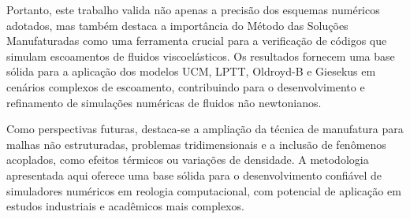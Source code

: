 Portanto, este trabalho valida não apenas a precisão dos esquemas numéricos adotados, mas também destaca a importância do Método das Soluções Manufaturadas como uma ferramenta crucial para a verificação de códigos que simulam escoamentos de fluidos viscoelásticos. Os resultados fornecem uma base sólida para a aplicação dos modelos UCM, LPTT, Oldroyd-B e Giesekus em cenários complexos de escoamento, contribuindo para o desenvolvimento e refinamento de simulações numéricas de fluidos não newtonianos.

Como perspectivas futuras, destaca-se a ampliação da técnica de manufatura para malhas não estruturadas, problemas tridimensionais e a inclusão de fenômenos acoplados, como efeitos térmicos ou variações de densidade. A metodologia apresentada aqui oferece uma base sólida para o desenvolvimento confiável de simuladores numéricos em reologia computacional, com potencial de aplicação em estudos industriais e acadêmicos mais complexos.





